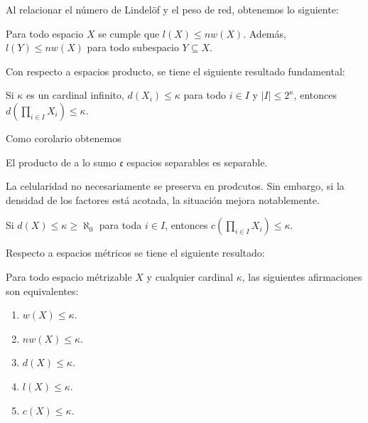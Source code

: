 \documentclass[12pt]{report}
\theoremstyle{largebreak}
\newcommand\abs[1]{\ensuremath{\lvert#1\rvert}}
\begin{document}
    Al relacionar el número de Lindelöf y el peso de red, obtenemos lo siguiente:

    \begin{theor}
        Para todo espacio $X$ se cumple que $l(X)\leq nw(X)$. Además, $l(Y)\leq nw(X)$ para todo subespacio $Y\subseteq X$.
    \end{theor}

    Con respecto a espacios producto, se tiene el siguiente resultado fundamental:

    \begin{theor}
        Si $\kappa$ es un cardinal infinito, $d(X_i)\leq\kappa$ para todo $i\in I$ y $\abs{I}\leq 2^{\kappa}$, entonces $d\left(\prod_{ i\in I}X_i\right)\leq\kappa$.
    \end{theor}
    
    Como corolario obtenemos

    \begin{cor}
        El producto de a lo sumo $\mathfrak{c}$ espacios separables es separable.
    \end{cor}

    La celularidad no necesariamente se preserva en prodcutos. Sin embargo, si la densidad de los factores está acotada, la situación mejora notablemente.

    \begin{theor}
        Si $d(X)\leq\kappa\geq\aleph_0$ para toda $i\in I$, entonces $c\left(\prod_{ i\in I}X_i \right)\leq\kappa$.
    \end{theor}

    Respecto a espacios métricos se tiene el siguiente resultado:

    \begin{theor}
        Para todo espacio métrizable $X$ y cualquier cardinal $\kappa$, las siguientes afirmaciones son equivalentes:
        \begin{enumerate}
            \item $w(X)\leq\kappa$.
            \item $nw(X)\leq\kappa$.
            \item $d(X)\leq\kappa$.
            \item $l(X)\leq\kappa$.
            \item $c(X)\leq\kappa$.
        \end{enumerate}
    \end{theor}
\end{document}
